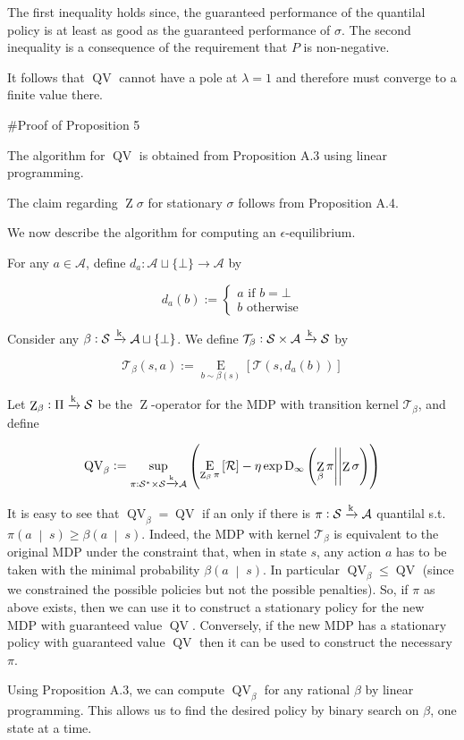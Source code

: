 \documentclass[a4paper]{article}
\newcommand{\AP}[1]{\left(#1\right)}
\newcommand{\AB}[1]{\left[#1\right]}
\newcommand{\APM}[2]{\left(#1\;\middle\vert\;#2\right)}
\newcommand{\Ea}[2]{\underset{#1}{\operatorname{E}}\AB{#2}}
\newcommand{\RD}[3]{\operatorname{D}_{#1}\AP{#2\middle\vert\middle\vert#3}}
\newcommand{\K}{\xrightarrow{\textnormal{k}}}
\newcommand{\A}{\mathcal{A}}
\newcommand{\St}{\mathcal{S}}
\newcommand{\T}{\mathcal{T}}
\newcommand{\R}{\mathcal{R}}
\newcommand{\QV}{\operatorname{QV}}
\DeclareMathOperator{\Z}{Z}
\begin{document}
The first inequality holds since, the guaranteed performance of the quantilal policy is at least as good as the guaranteed performance of $\sigma$. The second inequality is a consequence of the requirement that $P$ is non-negative.

It follows that $\QV$ cannot have a pole at $\lambda = 1$ and therefore must converge to a finite value there.

\#Proof of Proposition 5

The algorithm for $\QV$ is obtained from Proposition A.3 using linear programming. 

The claim regarding $\Z\sigma$ for stationary $\sigma$ follows from Proposition A.4.

We now describe the algorithm for computing an $\epsilon$-equilibrium.

For any $a \in \A$, define $d_a: \A \sqcup \{\bot\} \rightarrow \A$ by

$$d_a(b) :=  \begin{cases} a \text{ if } b=\bot \\ b \text{ otherwise} \end{cases}$$

Consider any $\beta: \St \K \A \sqcup \{\bot\}$. We define $\T_\beta: \St \times \A \K \St$ by

$$\T_\beta(s,a) := \Ea{b \sim \beta(s)}{\T\AP{s,d_a(b)}}$$

Let $\Z_\beta: \Pi \K \St$ be the $\Z$-operator for the MDP with transition kernel $\T_\beta$, and define

$$\QV_\beta := \sup_{\pi: \St^*\times\St \K \A}\AP{\Ea{\Z_\beta{\pi}}{\R}-\eta \exp{\RD{\infty}{\Z_\beta{\pi}}{\Z{\sigma}}}}$$

It is easy to see that $\QV_\beta = \QV$ if an only if there is $\pi: \St \K \A$ quantilal s.t. $\pi\APM{a}{s} \geq \beta\APM{a}{s}$. Indeed, the MDP with kernel $\T_\beta$ is equivalent to the original MDP under the constraint that, when in state $s$, any action $a$ has to be taken with the minimal probability $\beta\APM{a}{s}$. In particular $\QV_\beta \leq \QV$ (since we constrained the possible policies but not the possible penalties). So, if $\pi$ as above exists, then we can use it to construct a stationary policy for the new MDP with guaranteed value $\QV$. Conversely, if the new MDP has a stationary policy with guaranteed value $\QV$ then it can be used to construct the necessary $\pi$.

Using Proposition A.3, we can compute $\QV_\beta$ for any rational $\beta$ by linear programming. This allows us to find the desired policy by binary search on $\beta$, one state at a time.
\end{document}
